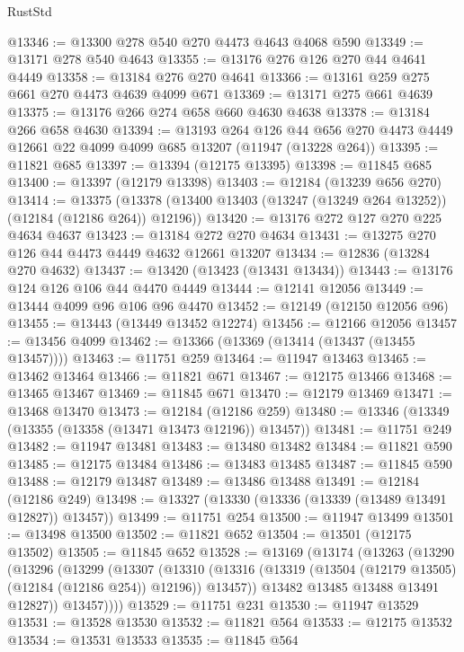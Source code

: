 \begin{lexlean}{RustStd}
\begin{coremodule}
@13346 := @13300 @278 @540 @270 @4473 @4643 @4068 @590
@13349 := @13171 @278 @540 @4643
@13355 := @13176 @276 @126 @270 @44 @4641 @4449
@13358 := @13184 @276 @270 @4641
@13366 := @13161 @259 @275 @661 @270 @4473 @4639 @4099 @671
@13369 := @13171 @275 @661 @4639
@13375 := @13176 @266 @274 @658 @660 @4630 @4638
@13378 := @13184 @266 @658 @4630
@13394 := @13193
    @264
    @126
    @44
    @656
    @270
    @4473
    @4449
    @12661
    @22
    @4099
    @4099
    @685
    @13207
    (@11947 (@13228 @264))
@13395 := @11821 @685
@13397 := @13394 (@12175 @13395)
@13398 := @11845 @685
@13400 := @13397 (@12179 @13398)
@13403 := @12184 (@13239 @656 @270)
@13414 := @13375
    (@13378 (@13400 @13403 (@13247 (@13249 @264 @13252)) (@12184 (@12186 @264)) @12196))
@13420 := @13176 @272 @127 @270 @225 @4634 @4637
@13423 := @13184 @272 @270 @4634
@13431 := @13275 @270 @126 @44 @4473 @4449 @4632 @12661 @13207
@13434 := @12836 (@13284 @270 @4632)
@13437 := @13420 (@13423 (@13431 @13434))
@13443 := @13176 @124 @126 @106 @44 @4470 @4449
@13444 := @12141 @12056
@13449 := @13444 @4099 @96 @106 @96 @4470
@13452 := @12149 (@12150 @12056 @96)
@13455 := @13443 (@13449 @13452 @12274)
@13456 := @12166 @12056
@13457 := @13456 @4099
@13462 := @13366 (@13369 (@13414 (@13437 (@13455 @13457))))
@13463 := @11751 @259
@13464 := @11947 @13463
@13465 := @13462 @13464
@13466 := @11821 @671
@13467 := @12175 @13466
@13468 := @13465 @13467
@13469 := @11845 @671
@13470 := @12179 @13469
@13471 := @13468 @13470
@13473 := @12184 (@12186 @259)
@13480 := @13346 (@13349 (@13355 (@13358 (@13471 @13473 @12196)) @13457))
@13481 := @11751 @249
@13482 := @11947 @13481
@13483 := @13480 @13482
@13484 := @11821 @590
@13485 := @12175 @13484
@13486 := @13483 @13485
@13487 := @11845 @590
@13488 := @12179 @13487
@13489 := @13486 @13488
@13491 := @12184 (@12186 @249)
@13498 := @13327 (@13330 (@13336 (@13339 (@13489 @13491 @12827)) @13457))
@13499 := @11751 @254
@13500 := @11947 @13499
@13501 := @13498 @13500
@13502 := @11821 @652
@13504 := @13501 (@12175 @13502)
@13505 := @11845 @652
@13528 := @13169
    (@13174
      (@13263
        (@13290
          (@13296
            (@13299
              (@13307
                (@13310
                  (@13316 (@13319 (@13504 (@12179 @13505) (@12184 (@12186 @254)) @12196)) @13457))
                @13482
                @13485
                @13488
                @13491
                @12827))
            @13457))))
@13529 := @11751 @231
@13530 := @11947 @13529
@13531 := @13528 @13530
@13532 := @11821 @564
@13533 := @12175 @13532
@13534 := @13531 @13533
@13535 := @11845 @564

\end{coremodule}
\end{lexlean}
